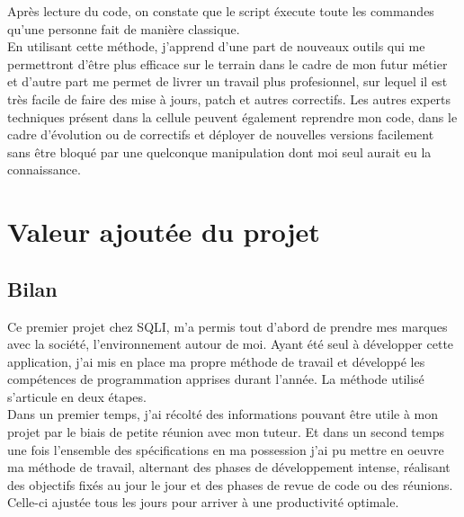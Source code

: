 \documentclass{report}
\newcommand{\jumpOne}{\\[1\baselineskip]}
\begin{document}
Après lecture du code, on constate que le script éxecute toute les commandes qu'une personne fait de manière classique.
\jumpOne
En utilisant cette méthode, j'apprend d'une part de nouveaux outils qui me permettront d'être plus efficace sur le terrain dans le cadre de mon futur métier et d'autre part me permet de livrer un travail plus profesionnel, sur lequel il est très facile de faire des mise à jours, \gls{patch} et autres correctifs. Les autres experts techniques présent dans la cellule peuvent également reprendre mon code, dans le cadre d'évolution ou de correctifs et déployer de nouvelles versions facilement sans être bloqué par une quelconque manipulation dont moi seul aurait eu la connaissance.  





\newpage





\section{Valeur ajoutée du projet}
\subsection{Bilan}
Ce premier projet chez SQLI, m'a permis tout d'abord de prendre mes marques avec la société, l'environnement autour de moi. Ayant été seul à développer cette application, j'ai mis en place ma propre méthode de travail et développé les compétences de programmation apprises durant l'année.
La méthode utilisé s'articule en deux étapes.\\ 
Dans un premier temps, j'ai récolté des informations pouvant être utile à mon projet par le biais de petite réunion avec mon tuteur. Et dans un second temps une fois l'ensemble des spécifications en ma possession j'ai pu mettre en oeuvre ma méthode de travail, alternant des phases de développement intense, réalisant des objectifs fixés au jour le jour et des phases de revue de code ou des réunions. Celle-ci ajustée tous les jours pour arriver à une productivité optimale.
\end{document}
